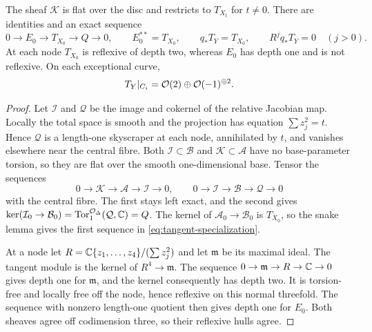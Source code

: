 \begin{proposition}\label{prop:tangent-sheaf}
The sheaf $\mathcal K$ is flat over the disc and restricts to $T_{X_t}$
for $t\ne0$. There are identities and an exact sequence
\begin{equation}\label{eq:tangent-specialization}
 0\to E_0\to T_{X_0}\to Q\to0,\qquad
 E_0^{**}=T_{X_0},\qquad q_*T_Y=T_{X_0},\qquad
 R^jq_*T_Y=0\quad(j>0).
\end{equation}
At each node $T_{X_0}$ is reflexive of depth two, whereas $E_0$ has
depth one and is not reflexive. On each exceptional curve,
\begin{equation}\label{eq:tangent-splitting}
 T_Y|_{C_i}=\mathcal O(2)\oplus\mathcal O(-1)^{\oplus2}.
\end{equation}
\end{proposition}
\begin{proof}
Let $\mathcal I$ and $\mathcal Q$ be the image and cokernel of the
relative Jacobian map. Locally the total space is smooth and the
projection has equation $\sum z_j^2=t$. Hence $\mathcal Q$ is a
length-one skyscraper at each node, annihilated by $t$, and vanishes
elsewhere near the central fibre. Both $\mathcal I\subset\mathcal B$
and $\mathcal K\subset\mathcal A$ have no base-parameter torsion,
so they are flat over the smooth one-dimensional base. Tensor the
sequences
\[
 0\to\mathcal K\to\mathcal A\to\mathcal I\to0,
 \qquad 0\to\mathcal I\to\mathcal B\to\mathcal Q\to0
\]
with the central fibre. The first stays left exact, and the second
gives $\ker(\mathcal I_0\to\mathcal B_0)=
\operatorname{Tor}_1^{\mathcal O_\Delta}(\mathcal Q,\mathbb C)=Q$.
The kernel of $\mathcal A_0\to\mathcal B_0$ is $T_{X_0}$, so the
snake lemma gives the first sequence in \eqref{eq:tangent-specialization}.

At a node let $R=\mathbb C\{z_1,\ldots,z_4\}/(\sum z_j^2)$ and let
$\mathfrak m$ be its maximal ideal. The tangent module is the kernel
of $R^4\to\mathfrak m$. The sequence
$0\to\mathfrak m\to R\to\mathbb C\to0$ gives depth one for $\mathfrak m$,
and the kernel consequently has depth two. It is torsion-free and
locally free off the node, hence reflexive on this normal threefold.
The sequence with nonzero length-one quotient then gives depth one
for $E_0$. Both sheaves agree off codimension three, so their reflexive
hulls agree.


\end{proof}
